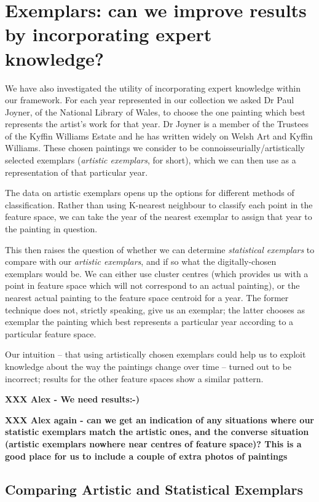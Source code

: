 \documentclass[conference,a4paper]{IEEEtran}
\begin{document}
\section{Exemplars: can we improve results by incorporating expert knowledge? }

We have also investigated the utility of incorporating expert knowledge within
our framework. For each year represented in our collection we asked Dr Paul
Joyner, of the National Library of Wales, to choose the one painting which best
represents the artist's work for that year. Dr Joyner is a member of the
Trustees of the Kyffin Williams Estate and he has written widely on Welsh Art
and Kyffin Williams. These chosen paintings we consider to be
connoisseurially/artistically selected exemplars (\emph{artistic exemplars}, for
short), which we can then use as a representation of that particular year.

The data on artistic exemplars opens up the options for different methods of
classification. Rather than using K-nearest neighbour to classify each point in
the feature space, we can take the year of the nearest exemplar to assign that year
to the painting in question. 

This then raises the question of whether we can determine \emph{statistical
exemplars} to compare with our \emph{artistic exemplars}, and if so what the
digitally-chosen exemplars would be.  We can either use cluster centres (which
provides us with a point in feature space which will not correspond to an
actual painting), or the nearest actual painting to the feature space centroid
for a year. The former technique does not, strictly speaking, give us an
exemplar; the latter chooses as exemplar the painting which best represents a
particular year according to a particular feature space. 

Our intuition -- that using artistically chosen exemplars could help us to exploit
knowledge about the way the paintings change over time -- turned out to be
incorrect; results for the other feature spaces show a similar pattern.


\textbf{XXX Alex - We need results:-)}

\textbf{XXX Alex again - can we get an indication of any situations where our statistic exemplars match the artistic ones, and the converse situation (artistic exemplars nowhere near centres of feature space)? This is a good place for us to include a couple of extra photos of paintings}

\subsection{Comparing Artistic and Statistical Exemplars}
\end{document}
